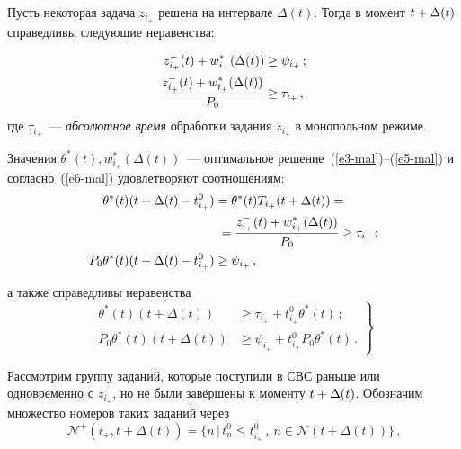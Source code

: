 \begin{multicols}{2}
Пусть некоторая задача $z_{i_+}$ решена на интервале $\Delta(t)$.
Тогда в момент $t\hm + \Delta(t)$ справедливы следующие неравенства:

\noindent
\begin{align*}
 z^-_{i_+}(t)+w^*_{i_+}(\Delta(t))& \ge \psi_{i_+}\,; \\
\displaystyle\frac{\displaystyle z^-_{i_+}(t)+w^*_{i_+}(\Delta(t))\mathstrut}{\displaystyle P_0\mathstrut} &\ge \tau_{i_+}\,, 
\end{align*}
где $\tau_{i_+}$~--- \textit{абсолютное время} обработки задания $z_{i_+}$ в 
монопольном режиме.

Значения $ \theta^*(t), w_{i_+}^*(\Delta(t))$~--- оптимальное
решение~(\ref{e3-mal})--(\ref{e5-mal}) и согласно~(\ref{e6-mal}) удовлетворяют соотношениям:
\begin{align*}
 \theta^*(t)  (t + \Delta(t) - t^0_{i_+}) &=  
 \theta^*(t)  T_{i_+}(t + \Delta(t))  = {}\\
 &\hspace*{1mm}{}= \displaystyle\frac{\displaystyle z^-_{i_+}(t)+w^*_{i_+}(\Delta(t))\mathstrut}{\displaystyle P_0\mathstrut}  
 \ge \tau_{i_+}\,;\\
P_0 \theta^*(t)  (t + \Delta(t) - t^0_{i_+}) & \ge \psi_{i_+}\,, 
\end{align*}

\columnbreak

\noindent
а также справедливы неравенства
\begin{equation}
\left.  \begin{array}{rl}
 \theta^*(t) (t + \Delta(t)) &\ge \tau_{i_+} +   t^0_{i_+} \theta^*(t)\,;\\[9pt]
P_0 \theta^*(t)(t + \Delta(t)) &\ge \psi_{i_+} + t^0_{i_+} P_0 \theta^*(t) \,.
                    \end{array}
                    \right \}
                    \label{e7-mal}
                    \end{equation}

Рассмотрим группу заданий, которые поступили в СВС раньше или
одновременно с $z_{i_+}$, но не были завершены к моменту $t \hm+
\Delta(t)$. Обозначим множество номеров таких заданий через
$$
\mathcal{N}^+(i_+, t + \Delta(t)) = \{n \, \vert \,  t^0_{n} \le  t^0_{i_+}\,,\ 
n \in \mathcal{N}(t + \Delta(t))\}\,.
$$


\end{multicols}
